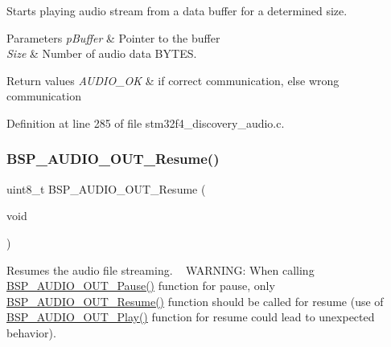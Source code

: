 Starts playing audio stream from a data buffer for a determined size. 


\begin{DoxyParams}{Parameters}
{\em p\+Buffer} & Pointer to the buffer \\
\hline
{\em Size} & Number of audio data B\+Y\+T\+ES. \\
\hline
\end{DoxyParams}

\begin{DoxyRetVals}{Return values}
{\em A\+U\+D\+I\+O\+\_\+\+OK} & if correct communication, else wrong communication \\
\hline
\end{DoxyRetVals}


Definition at line 285 of file stm32f4\+\_\+discovery\+\_\+audio.\+c.

\mbox{\label{group___s_t_m32_f4___d_i_s_c_o_v_e_r_y___a_u_d_i_o___o_u_t___exported___functions_ga064f0eddd4ab25a33fd1fe83af429c9f}} 
\subsubsection{\texorpdfstring{B\+S\+P\+\_\+\+A\+U\+D\+I\+O\+\_\+\+O\+U\+T\+\_\+\+Resume()}{BSP\_AUDIO\_OUT\_Resume()}}
{\footnotesize\ttfamily uint8\+\_\+t B\+S\+P\+\_\+\+A\+U\+D\+I\+O\+\_\+\+O\+U\+T\+\_\+\+Resume (\begin{DoxyParamCaption}\item[{void}]{ }\end{DoxyParamCaption})}



Resumes the audio file streaming. ~\newline
W\+A\+R\+N\+I\+NG\+: When calling \mbox{\hyperlink{group___s_t_m32_f4___d_i_s_c_o_v_e_r_y___a_u_d_i_o___o_u_t___private___functions_ga73a0f92b8adbfb2e8207067434c2bfef}{B\+S\+P\+\_\+\+A\+U\+D\+I\+O\+\_\+\+O\+U\+T\+\_\+\+Pause()}} function for pause, only \mbox{\hyperlink{group___s_t_m32_f4___d_i_s_c_o_v_e_r_y___a_u_d_i_o___o_u_t___private___functions_ga064f0eddd4ab25a33fd1fe83af429c9f}{B\+S\+P\+\_\+\+A\+U\+D\+I\+O\+\_\+\+O\+U\+T\+\_\+\+Resume()}} function should be called for resume (use of \mbox{\hyperlink{group___s_t_m32_f4___d_i_s_c_o_v_e_r_y___a_u_d_i_o___o_u_t___private___functions_gaa415fdd481a01468fdfcd9d91f0f6711}{B\+S\+P\+\_\+\+A\+U\+D\+I\+O\+\_\+\+O\+U\+T\+\_\+\+Play()}} function for resume could lead to unexpected behavior). 


